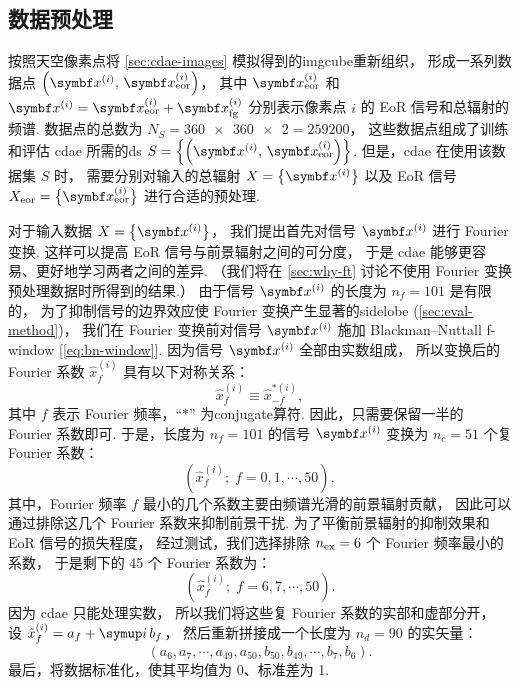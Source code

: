 \subsection{数据预处理}
\label{sec:preprocessing}

按照天空像素点将 \autoref{sec:cdae-images} 模拟得到的\ac{imgcube}重新组织，
形成一系列数据点 $\left( \B{x}^{(i)}, \,\B{x}^{(i)}_{\R{eor}} \right)$，
其中 $\B{x}^{(i)}_{\R{eor}}$ 和
$\B{x}^{(i)} = \B{x}^{(i)}_{\R{eor}} + \B{x}^{(i)}_{\R{fg}}$
分别表示像素点 $i$ 的 EoR 信号和总辐射的频谱.
数据点的总数为 $N_S = \num{360x360 x 2} = \num{259200}$，
这些数据点组成了训练和评估 \ac{cdae} 所需的\ac{ds}
$S = \left\{ \left(\B{x}^{(i)}, \,\B{x}^{(i)}_{\R{eor}} \right) \right\}$.
但是，\ac{cdae} 在使用该数据集 $S$ 时，
需要分别对输入的总辐射 $X = \big\{ \B{x}^{(i)} \big\}$
以及 EoR 信号 $X_{\R{eor}} = \big\{ \B{x}^{(i)}_{\R{eor}} \big\}$
进行合适的预处理.

对于输入数据 $X = \big\{ \B{x}^{(i)} \big\}$，
我们提出首先对信号 $\B{x}^{(i)}$ 进行 Fourier 变换.
这样可以提高 EoR 信号与前景辐射之间的可分度，
于是 \ac{cdae} 能够更容易、更好地学习两者之间的差异.
（我们将在 \autoref{sec:why-ft} 讨论不使用 Fourier 变换预处理数据时所得到的结果.）
由于信号 $\B{x}^{(i)}$ 的长度为 $n_f = 101$ 是有限的，
为了抑制信号的边界效应使 Fourier 变换产生显著的\ac{sidelobe}
(\autoref{sec:eval-method})，
我们在 Fourier 变换前对信号 $\B{x}^{(i)}$ 施加 Blackman--Nuttall \ac{f-window}
\cite{chapman2016} [\autoref{eq:bn-window}].
因为信号 $\B{x}^{(i)}$ 全部由实数组成，
所以变换后的 Fourier 系数 $\hat{x}^{(i)}_{f}$ 具有以下对称关系：
\begin{equation}
  \hat{x}^{(i)}_{f} \equiv \hat{x}^{*(i)}_{-f} ,
\end{equation}
其中 $f$ 表示 Fourier 频率，\enquote{$*$} 为\ac{conjugate}算符.
因此，只需要保留一半的 Fourier 系数即可.
于是，长度为 $n_f = 101$ 的信号 $\B{x}^{(i)}$ 变换为
$n_c = 51$ 个复 Fourier 系数：
\begin{equation}
  \left( \hat{x}^{(i)}_f; \; f = 0, 1, \cdots, 50 \right) ,
\end{equation}
其中，Fourier 频率 $f$ 最小的几个系数主要由频谱光滑的前景辐射贡献，
因此可以通过排除这几个 Fourier 系数来抑制前景干扰.
为了平衡前景辐射的抑制效果和 EoR 信号的损失程度，
经过测试，我们选择排除 $n_{\mathrm{ex}} = 6$ 个 Fourier 频率最小的系数，
于是剩下的 45 个 Fourier 系数为：
\begin{equation}
  \left( \hat{x}^{(i)}_f; \; f = 6, 7, \cdots, 50 \right) .
\end{equation}
因为 \ac{cdae} 只能处理实数，
所以我们将这些复 Fourier 系数的实部和虚部分开，
设 $\hat{x}^{(i)}_f = a_f + \Ci\,b_f$，
然后重新拼接成一个长度为 $n_d = 90$ 的实矢量：
\begin{equation}
  (a_6, a_7, \cdots, a_{49}, a_{50},
   b_{50}, b_{49}, \cdots, b_7, b_6) .
\end{equation}
最后，将数据标准化，使其平均值为 0、标准差为 1.

